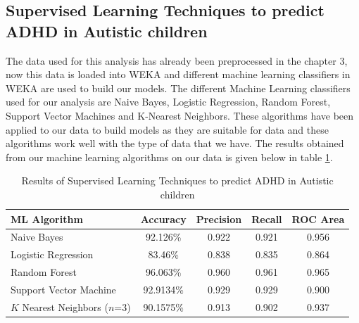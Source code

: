 \subsection{Supervised Learning Techniques to predict ADHD in Autistic children}
The data used for this analysis has already been preprocessed in the chapter 3, now this data is loaded into WEKA and different machine learning classifiers in WEKA are used to build our models. The different Machine Learning classifiers used for our analysis are Naive Bayes, Logistic Regression, Random Forest, Support Vector Machines and K-Nearest Neighbors. These algorithms have been applied to our data to build models as they are suitable for data and these algorithms work well with the type of data that we have. The results obtained from our machine learning algorithms on our data is given below in table \ref{table:51}.
\begin{table}[h]
\begin{center}
\begin{tabular}{|l|c|c|c|c|}
\hline
\textbf{ML Algorithm} & \textbf{Accuracy}&	\textbf{Precision}&	\textbf{Recall}&	\textbf{ROC Area}\\
\hline \hline
Naive Bayes	&92.126\%&	0.922&	0.921&	0.956\\
\hline
Logistic Regression&	83.46\%&	0.838&	0.835&	0.864\\
\hline
Random Forest&	96.063\%&	0.960&	0.961&	0.965\\
\hline
Support Vector Machine&	92.9134\%&	0.929&	0.929&	0.900\\
\hline
$K$ Nearest Neighbors ($n$=3)&	90.1575\%&	0.913&	0.902&	0.937\\
\hline
\end{tabular}
\end{center}
\caption{Results of Supervised Learning Techniques to predict ADHD in Autistic children}
\label{table:51}
\end{table}

